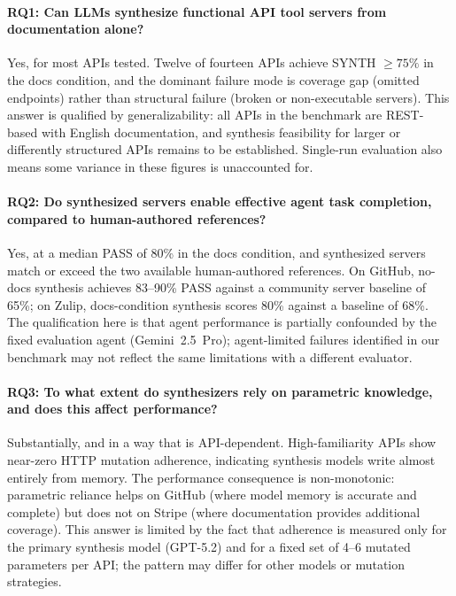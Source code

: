 \documentclass[12pt]{report}
\begin{document}
\paragraph{RQ1: Can LLMs synthesize functional API tool servers from
documentation alone?}
Yes, for most APIs tested. Twelve of fourteen APIs achieve SYNTH $\geq 75\%$
in the docs condition, and the dominant failure mode is coverage gap (omitted
endpoints) rather than structural failure (broken or non-executable servers).
This answer is qualified by generalizability: all APIs in the benchmark are
REST-based with English documentation, and synthesis feasibility for larger
or differently structured APIs remains to be established. Single-run
evaluation also means some variance in these figures is unaccounted for.

\paragraph{RQ2: Do synthesized servers enable effective agent task completion,
compared to human-authored references?}
Yes, at a median PASS of 80\% in the docs condition, and synthesized servers
match or exceed the two available human-authored references. On GitHub,
no-docs synthesis achieves 83--90\% PASS against a community server baseline
of 65\%; on Zulip, docs-condition synthesis scores 80\% against a baseline
of 68\%. The qualification here is that agent performance is partially
confounded by the fixed evaluation agent (Gemini~2.5~Pro); agent-limited
failures identified in our benchmark may not reflect the same limitations
with a different evaluator.

\paragraph{RQ3: To what extent do synthesizers rely on parametric knowledge,
and does this affect performance?}
Substantially, and in a way that is API-dependent. High-familiarity APIs
show near-zero HTTP mutation adherence, indicating synthesis models write
almost entirely from memory. The performance consequence is non-monotonic:
parametric reliance helps on GitHub (where model memory is accurate and
complete) but does not on Stripe (where documentation provides additional
coverage). This answer is limited by the fact that adherence is measured
only for the primary synthesis model (GPT-5.2) and for a fixed set of
4--6 mutated parameters per API; the pattern may differ for other models
or mutation strategies.
\end{document}
